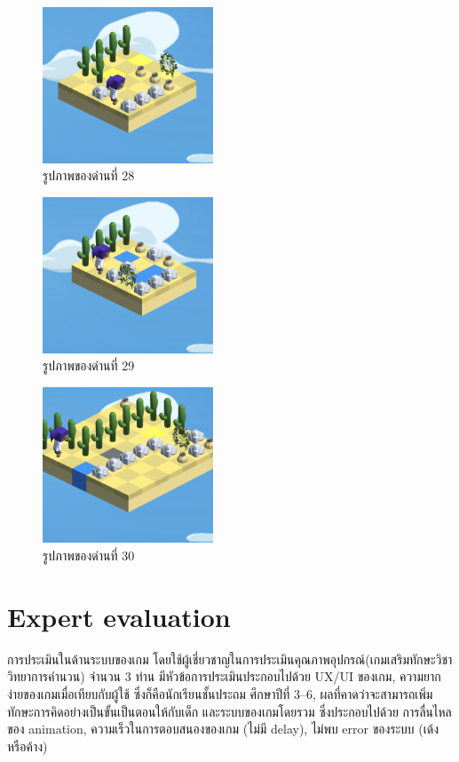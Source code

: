 \begin{figure}[H]
    \begin{center}
    \includegraphics[width=2in]{pic-toro/stage/s28.png}
    \end{center}
    \caption[รูปภาพของด่านที่ 28]{รูปภาพของด่านที่ 28}
    \label{s28}
\end{figure}
\begin{figure}[H]
    \begin{center}
    \includegraphics[width=2in]{pic-toro/stage/s29.png}
    \end{center}
    \caption[รูปภาพของด่านที่ 29]{รูปภาพของด่านที่ 29}
    \label{s29}
\end{figure}
\begin{figure}[H]
    \begin{center}
    \includegraphics[width=2in]{pic-toro/stage/s30.png}
    \end{center}
    \caption[รูปภาพของด่านที่ 30]{รูปภาพของด่านที่ 30}
    \label{s30}
\end{figure}
\pagebreak
\section{Expert evaluation}
การประเมินในด้านระบบของเกม โดยใช้ผู้เชี่ยวชาญในการประเมินคุณภาพอุปกรณ์(เกมเสริมทักษะวิชาวิทยาการคำนวน) จำนวน 3 ท่าน มีหัวข้อการประเมินประกอบไปด้วย UX/UI ของเกม, ความยากง่ายของเกมเมื่อเทียบกับผู้ใช้ ซึ่งก็คือนักเรียนชั้นประถม
ศึกษาปีที่ 3--6, ผลที่คาดว่าจะสามารถเพิ่มทักษะการคิดอย่างเป็นขั้นเป็นตอนให้กับเด็ก และระบบของเกมโดยรวม ซึ่งประกอบไปด้วย 
การลื่นไหลของ animation, ความเร็วในการตอบสนองของเกม (ไม่มี delay), ไม่พบ error ของระบบ (เด้งหรือค้าง)

